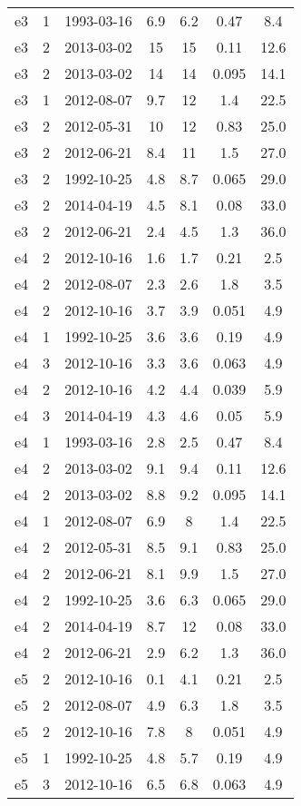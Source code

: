 \begin{table*}[htp]
\begin{tabular}{ccccccc}
e3 & 1 & 1993-03-16 & 6.9 & 6.2 & 0.47 & 8.4 \\
e3 & 2 & 2013-03-02 & 15 & 15 & 0.11 & 12.6 \\
e3 & 2 & 2013-03-02 & 14 & 14 & 0.095 & 14.1 \\
e3 & 1 & 2012-08-07 & 9.7 & 12 & 1.4 & 22.5 \\
e3 & 2 & 2012-05-31 & 10 & 12 & 0.83 & 25.0 \\
e3 & 2 & 2012-06-21 & 8.4 & 11 & 1.5 & 27.0 \\
e3 & 2 & 1992-10-25 & 4.8 & 8.7 & 0.065 & 29.0 \\
e3 & 2 & 2014-04-19 & 4.5 & 8.1 & 0.08 & 33.0 \\
e3 & 2 & 2012-06-21 & 2.4 & 4.5 & 1.3 & 36.0 \\
e4 & 2 & 2012-10-16 & 1.6 & 1.7 & 0.21 & 2.5 \\
e4 & 2 & 2012-08-07 & 2.3 & 2.6 & 1.8 & 3.5 \\
e4 & 2 & 2012-10-16 & 3.7 & 3.9 & 0.051 & 4.9 \\
e4 & 1 & 1992-10-25 & 3.6 & 3.6 & 0.19 & 4.9 \\
e4 & 3 & 2012-10-16 & 3.3 & 3.6 & 0.063 & 4.9 \\
e4 & 2 & 2012-10-16 & 4.2 & 4.4 & 0.039 & 5.9 \\
e4 & 3 & 2014-04-19 & 4.3 & 4.6 & 0.05 & 5.9 \\
e4 & 1 & 1993-03-16 & 2.8 & 2.5 & 0.47 & 8.4 \\
e4 & 2 & 2013-03-02 & 9.1 & 9.4 & 0.11 & 12.6 \\
e4 & 2 & 2013-03-02 & 8.8 & 9.2 & 0.095 & 14.1 \\
e4 & 1 & 2012-08-07 & 6.9 & 8 & 1.4 & 22.5 \\
e4 & 2 & 2012-05-31 & 8.5 & 9.1 & 0.83 & 25.0 \\
e4 & 2 & 2012-06-21 & 8.1 & 9.9 & 1.5 & 27.0 \\
e4 & 2 & 1992-10-25 & 3.6 & 6.3 & 0.065 & 29.0 \\
e4 & 2 & 2014-04-19 & 8.7 & 12 & 0.08 & 33.0 \\
e4 & 2 & 2012-06-21 & 2.9 & 6.2 & 1.3 & 36.0 \\
e5 & 2 & 2012-10-16 & 0.1 & 4.1 & 0.21 & 2.5 \\
e5 & 2 & 2012-08-07 & 4.9 & 6.3 & 1.8 & 3.5 \\
e5 & 2 & 2012-10-16 & 7.8 & 8 & 0.051 & 4.9 \\
e5 & 1 & 1992-10-25 & 4.8 & 5.7 & 0.19 & 4.9 \\
e5 & 3 & 2012-10-16 & 6.5 & 6.8 & 0.063 & 4.9 \\

\end{tabular}
\end{table*}
